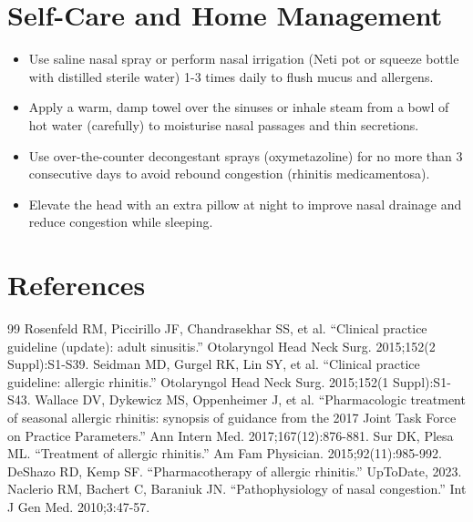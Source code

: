 \section*{Self-Care and Home Management}
\begin{itemize}
  \item Use saline nasal spray or perform nasal irrigation (Neti pot or squeeze bottle with distilled sterile water) 1-3 times daily to flush mucus and allergens.
  \item Apply a warm, damp towel over the sinuses or inhale steam from a bowl of hot water (carefully) to moisturise nasal passages and thin secretions.
  \item Use over-the-counter decongestant sprays (oxymetazoline) for no more than 3 consecutive days to avoid rebound congestion (rhinitis medicamentosa).
  \item Elevate the head with an extra pillow at night to improve nasal drainage and reduce congestion while sleeping.
\end{itemize}

\section*{References}
\begin{thebibliography}{99}
 Rosenfeld RM, Piccirillo JF, Chandrasekhar SS, et al. ``Clinical practice guideline (update): adult sinusitis.'' Otolaryngol Head Neck Surg. 2015;152(2 Suppl):S1-S39.
 Seidman MD, Gurgel RK, Lin SY, et al. ``Clinical practice guideline: allergic rhinitis.'' Otolaryngol Head Neck Surg. 2015;152(1 Suppl):S1-S43.
 Wallace DV, Dykewicz MS, Oppenheimer J, et al. ``Pharmacologic treatment of seasonal allergic rhinitis: synopsis of guidance from the 2017 Joint Task Force on Practice Parameters.'' Ann Intern Med. 2017;167(12):876-881.
 Sur DK, Plesa ML. ``Treatment of allergic rhinitis.'' Am Fam Physician. 2015;92(11):985-992.
 DeShazo RD, Kemp SF. ``Pharmacotherapy of allergic rhinitis.'' UpToDate, 2023.
 Naclerio RM, Bachert C, Baraniuk JN. ``Pathophysiology of nasal congestion.'' Int J Gen Med. 2010;3:47-57.
\end{thebibliography}
